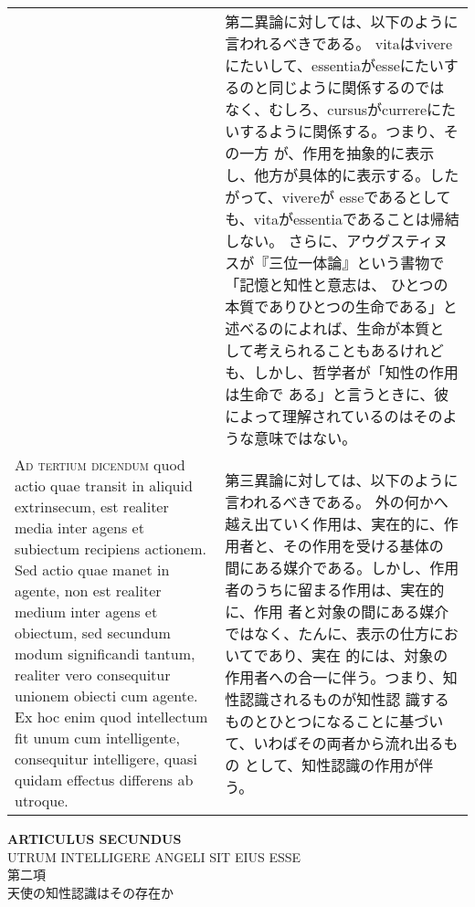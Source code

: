 \documentclass[10pt]{jsarticle} %
\begin{document}
\begin{longtable}{p{21em}p{21em}}
&

第二異論に対しては、以下のように言われるべきである。
vitaはvivereにたいして、essentiaがesseにたいするのと同じように関係するのでは
 なく、むしろ、cursusがcurrereにたいするように関係する。つまり、その一方
 が、作用を抽象的に表示し、他方が具体的に表示する。したがって、vivereが
 esseであるとしても、vitaがessentiaであることは帰結しない。
さらに、アウグスティヌスが『三位一体論』という書物で「記憶と知性と意志は、
 ひとつの本質でありひとつの生命である」と述べるのによれば、生命が本質と
 して考えられることもあるけれども、しかし、哲学者が「知性の作用は生命で
 ある」と言うときに、彼によって理解されているのはそのような意味ではない。



\\


{\scshape Ad tertium dicendum} quod actio quae transit in aliquid
 extrinsecum, est realiter media inter agens et subiectum recipiens
 actionem. Sed actio quae manet in agente, non est realiter medium inter
 agens et obiectum, sed secundum modum significandi tantum, realiter
 vero consequitur unionem obiecti cum agente. Ex hoc enim quod
 intellectum fit unum cum intelligente, consequitur intelligere, quasi
 quidam effectus differens ab utroque.


&

第三異論に対しては、以下のように言われるべきである。
外の何かへ越え出ていく作用は、実在的に、作用者と、その作用を受ける基体の
 間にある媒介である。しかし、作用者のうちに留まる作用は、実在的に、作用
 者と対象の間にある媒介ではなく、たんに、表示の仕方においてであり、実在
 的には、対象の作用者への合一に伴う。つまり、知性認識されるものが知性認
 識するものとひとつになることに基づいて、いわばその両者から流れ出るもの
 として、知性認識の作用が伴う。


\end{longtable}

\newpage




\begin{center}
 {\Large {\bf ARTICULUS SECUNDUS}}\\
 {\large UTRUM INTELLIGERE ANGELI SIT EIUS ESSE}\\
 {\Large 第二項\\天使の知性認識はその存在か}
\end{center}
\end{document}
